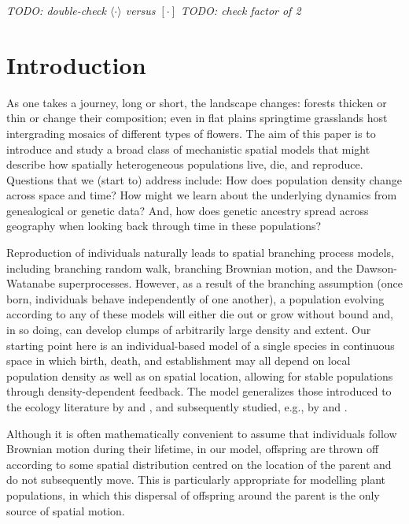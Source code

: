\documentclass[EJP]{ejpecp} %
\newcommand{\comment}[1]{{\color{blue} \it #1}}
\newcommand{\citet}[1]{\cite{#1}}
\begin{document}
\comment{TODO: double-check $\langle \cdot \rangle$ versus $[\cdot]$}
\comment{TODO: check factor of 2}

\section{Introduction}
\label{introduction}

As one takes a journey, long or short, the landscape changes:
forests thicken or thin or change their composition;
even in flat plains
springtime grasslands host intergrading mosaics of different types of flowers.
The aim of this paper is to introduce and study
a broad class of mechanistic spatial models
that might describe how spatially heterogeneous populations live, die, and reproduce.
Questions that we (start to) address include:
How does population density change across space and time?
How might we learn about the underlying dynamics from genealogical or genetic data?
And, how does genetic ancestry spread across geography
when looking back through time in these populations?

Reproduction of individuals naturally leads to spatial branching process models,
including branching random walk, 
branching Brownian motion, and the Dawson-Watanabe superprocesses.  
However, as a result of the branching assumption (once born, individuals behave 
independently of one another), 
a population evolving according to any of these models will
either die out or grow without bound and, in so doing, can
develop clumps of arbitrarily large density and extent. 
Our starting point here is an individual-based model of a single species 
in continuous space in which
birth, death, and establishment may all depend on local population density
as well as on spatial location,
allowing for stable populations through density-dependent feedback.
The model generalizes those introduced to the ecology literature by
\citet{bolker/pacala:1997} and \citet{law/murrell/dieckmann:2003},
and subsequently studied, e.g., by \citet{etheridge:2004} and \citet{fournier2004microscopic}.

Although it is often mathematically convenient to assume that individuals follow
Brownian motion during their lifetime, 
in our model, offspring are thrown off according to some 
spatial distribution centred on the location of the parent
and do not subsequently move.
This is particularly appropriate for modelling plant populations, in which
this dispersal of offspring around the parent is the only source of
spatial motion.
\end{document}
